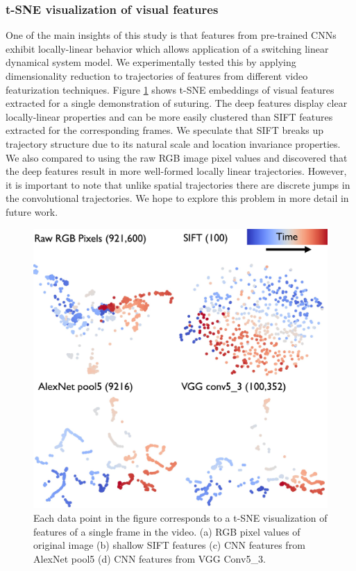 \subsubsection{t-SNE visualization of visual features}
One of the main insights of this study is that features from pre-trained CNNs exhibit locally-linear behavior which allows application of a switching linear dynamical system model. 
We experimentally tested this by applying dimensionality reduction to trajectories of features from different video featurization techniques.
Figure \ref{fig:tsne} shows t-SNE embeddings of visual features extracted for a single demonstration of suturing. The deep features display clear locally-linear properties and can be more easily clustered than SIFT features extracted for the corresponding frames. 
We speculate that SIFT breaks up trajectory structure due to its natural scale and location invariance properties.
We also compared to using the raw RGB image pixel values and discovered that the deep features result in more well-formed locally linear trajectories.
However, it is important to note that unlike spatial trajectories there are discrete jumps in the convolutional trajectories.
We hope to explore this problem in more detail in future work.

\begin{figure}[!ht]
\centering
    \includegraphics[width=0.45\linewidth]{tsc-experiments/t-SNE_suturing_v3}
    \caption{Each data point in the figure corresponds to a t-SNE visualization of features of a single frame in the video. (a) RGB pixel values of original image (b) shallow SIFT features (c) CNN features from AlexNet pool5 (d)  CNN features from VGG Conv5\_3.
    \label{fig:tsne}}
\end{figure}

